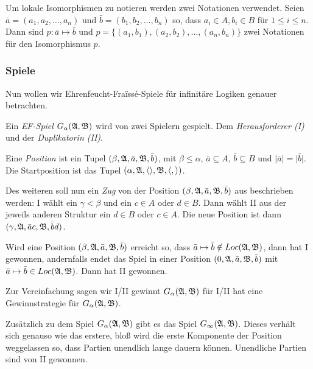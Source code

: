 Um lokale Isomorphismen zu notieren werden zwei Notationen verwendet. Seien $\bar{a}=(a_1,a_2,\dots,a_n)$ und $\bar{b}=(b_1,b_2,\dots,b_n)$ so, dass $a_i\in A,b_i\in B$ für $1\leq i \leq n$.
Dann sind $p:\bar{a}\mapsto\bar{b}$ und $p=\{(a_1,b_1),(a_2,b_2),\dots,(a_n,b_n)\}$ zwei Notationen für den Isomorphismus $p$.


\subsubsection*{Spiele}

Nun wollen wir Ehrenfeucht-Fra\"{i}ss\'{e}-Spiele für infinitäre Logiken genauer betrachten.
\begin{definition}
	Ein \textit{EF-Spiel} $G_\alpha(\mathfrak{A},\mathfrak{B})$ wird von zwei Spielern gespielt. Dem \textit{Herausforderer (I)} und der \textit{Duplikatorin (II)}. 
	
	Eine \textit{Position} ist ein Tupel $(\beta,\mathfrak{A},\bar{a},\mathfrak{B},\bar{b})$, mit $\beta\leq \alpha$, $\bar{a}\subseteq A$, $\bar{b}\subseteq B$ und $\vert\bar{a}\vert = \vert\bar{b}\vert$.
	Die Startposition ist das Tupel $(\alpha, \mathfrak{A},\langle\rangle,\mathfrak{B},\langle,\rangle)$.
	
	Des weiteren soll nun ein \textit{Zug} von der Position $(\beta,\mathfrak{A},\bar{a},\mathfrak{B},\bar{b})$ aus beschrieben werden: I wählt ein $\gamma < \beta$ und ein $c\in A$ oder $d\in B$. Dann wählt II aus der jeweils anderen Struktur ein $d\in B$ oder $c\in A$. Die neue Position ist dann $(\gamma,\mathfrak{A},\bar{a}c,\mathfrak{B},\bar{b}d)$.
	
	Wird eine Position $(\beta,\mathfrak{A},\bar{a},\mathfrak{B},\bar{b})$ erreicht so, dass $\bar{a}\mapsto\bar{b}\notin Loc(\mathfrak{A},\mathfrak{B})$, dann hat I gewonnen, andernfalls endet das Spiel in einer Position $(0,\mathfrak{A},\bar{a},\mathfrak{B},\bar{b})$ mit $\bar{a}\mapsto\bar{b}\in Loc(\mathfrak{A},\mathfrak{B})$. Dann hat II gewonnen.
\end{definition}

Zur Vereinfachung sagen wir \glqq I/II gewinnt $G_\alpha(\mathfrak{A},\mathfrak{B})$\grqq{} für \glqq I/II hat eine Gewinnstrategie für $G_\alpha(\mathfrak{A},\mathfrak{B})$\grqq{}.

\begin{definition}
	Zusätzlich zu dem Spiel $G_\alpha(\mathfrak{A},\mathfrak{B})$ gibt es das Spiel $G_\infty(\mathfrak{A},\mathfrak{B})$. 
	Dieses verhält sich genauso wie das erstere, bloß wird die erste Komponente der Position weggelassen so, dass Partien unendlich lange dauern können.
	Unendliche Partien sind von II gewonnen.
\end{definition}

